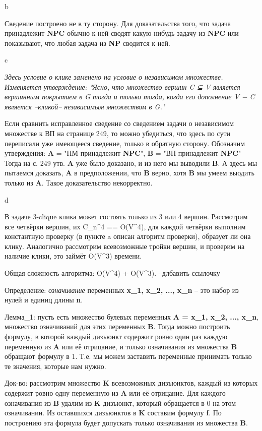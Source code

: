 \documentclass{article}
\begin{document}
b

Сведение построено не в ту сторону. Для доказательства того, что задача принадлежит \textbf{NPC} обычно к ней сводят какую-нибудь задачу из \textbf{NPC} или показывают, что любая задача из \textbf{NP} сводится к ней.

c

\textit{Здесь условие о клике заменено на условие о независимом множестве. Изменяется утверждение: "Ясно, что множество вершин C ⊆ V является вершинным покрытием в G тогда и только тогда, когда его дополнение V − C является --кликой-- независимым множеством в G."}

Если сравнить исправленное сведение со сведением задачи о независимом множестве к ВП на странице 249, то можно убедиться, что здесь по сути переписали уже имеющееся сведение, только в обратную сторону. Обозначим утверждения: \textbf{A} = "НМ принадлежит \textbf{NPC}", \textbf{B} = "ВП принадлежит \textbf{NPC}" Тогда на с. 249 утв. \textbf{A} уже было доказано, и из него мы выводили \textbf{B}. А здесь мы пытаемся доказать, \textbf{A} в предположении, что \textbf{B} верно, хотя \textbf{B} мы умеем выодить только из \textbf{A}. Такое доказательство некорректно.

d

В задаче 3-clique клика может состоять только из 3 или 4 вершин. Рассмотрим все четвёрки вершин, их C_n^4 == O(V^4), для каждой четвёрки выполним константную проверку (в пункте a описан алгоритм проверки), образует ли она клику. Аналогично рассмотрим всевозможные тройки вершин, и проверим на наличие клики, это займёт O(V^3) времени.

Общая сложность алгоритма: O(V^4) + O(V^3).
--длбавить ссылочку

Определение: \textit{означивание} переменных \textbf{x_1, x_2, ..., x_n} -- это набор из нулей и единиц длины \textbf{n}.

Лемма_1: пусть есть множество булевых переменных \textbf{A = {x_1, x_2, ..., x_n}}, множество означиваний для этих переменных \textbf{B}. Тогда можно построить формулу, в которой каждый дизъюнкт содержит ровно один раз каждую переменную из \textbf{A} или её отрицание, и только означивания из множества \textbf{B} обращают формулу в 1. Т.е. мы можем заставить переменные принимать только те значения, которые нам нужно.

Док-во: рассмотрим множество \textbf{K} всевозможных дизъюнктов, каждый из которых содержит ровно одну переменную из \textbf{A} или её отрицание. Для каждого означивания из \textbf{B} удалим из \textbf{K} дизъюнкт, который обращается в 0 на этом означивании. Из оставшихся дизъюнктов в \textbf{K} составим формулу \textbf{f}. По построению эта формула будет допускать только означивания из множества \textbf{B}.
\end{document}
